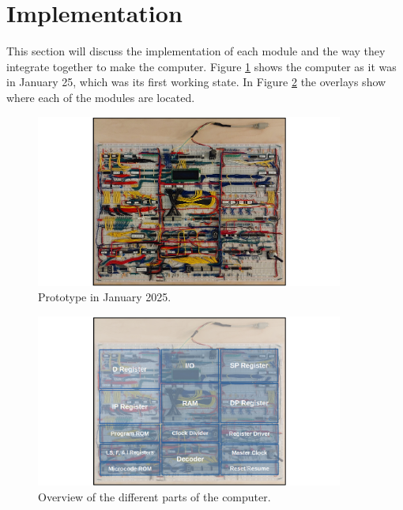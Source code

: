 \section{Implementation} \label{sec:implementation}
This section will discuss the implementation of each module and the way they integrate together to make the computer. Figure \ref{fig:computer} shows the computer as it was in January 25, which was its first working state. In Figure \ref{fig:computer_parts} the overlays show where each of the modules are located.

\begin{figure}[H]
  \centering
  \includegraphics[width=0.9\textwidth]{img/computer}
  \caption{Prototype in January 2025.}
  \label{fig:computer}
\end{figure}

\begin{figure}[H]
  \centering
  \includegraphics[width=0.9\textwidth]{img/computer_parts}
  \caption{Overview of the different parts of the computer.}
  \label{fig:computer_parts}
\end{figure}


